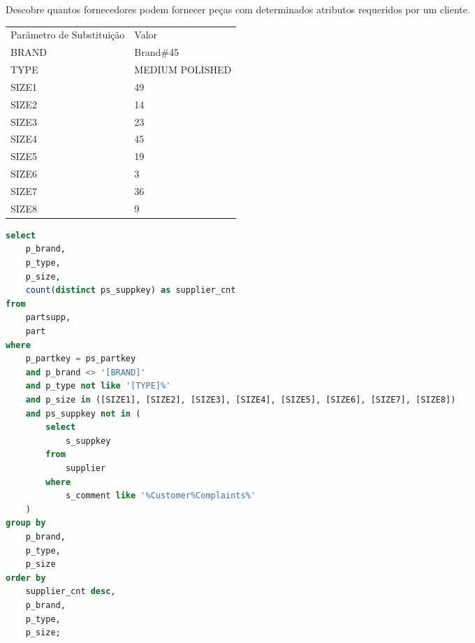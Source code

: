 \begin{enumerate}
Descobre quantos fornecedores podem fornecer peças com determinados atributos requeridos por um cliente. 

\begin{tabular}{ll}
	Parâmetro de Substituição & Valor\\
	BRAND & Brand$\#$45\\
	TYPE & MEDIUM POLISHED \\
	SIZE1 & 49 \\
	SIZE2 & 14 \\
	SIZE3 & 23 \\
	SIZE4 & 45 \\
	SIZE5 & 19 \\
	SIZE6 &  3 \\
	SIZE7 & 36 \\
	SIZE8 &  9 \\
\end{tabular}

	\begin{lstlisting}[language=SQL]
select
	p_brand,
	p_type,
	p_size,
	count(distinct ps_suppkey) as supplier_cnt
from
	partsupp,
	part
where
	p_partkey = ps_partkey
	and p_brand <> '[BRAND]'
	and p_type not like '[TYPE]%'
	and p_size in ([SIZE1], [SIZE2], [SIZE3], [SIZE4], [SIZE5], [SIZE6], [SIZE7], [SIZE8])
	and ps_suppkey not in (
		select
			s_suppkey
		from
			supplier
		where
			s_comment like '%Customer%Complaints%'
	)
group by
	p_brand,
	p_type,
	p_size
order by
	supplier_cnt desc,
	p_brand,
	p_type,
	p_size;
	
	\end{lstlisting}




	

\end{enumerate}
